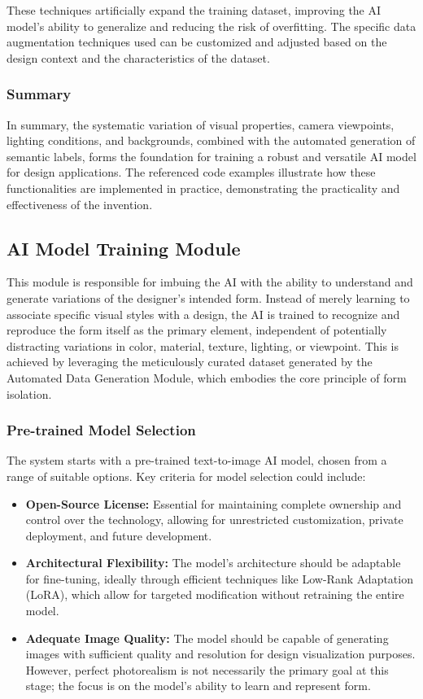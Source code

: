 \documentclass{article}
\begin{document}
These techniques artificially expand the training dataset, improving the AI model's ability to generalize and reducing the risk of overfitting. The specific data augmentation techniques used can be customized and adjusted based on the design context and the characteristics of the dataset.

\subsubsection{Summary}

In summary, the systematic variation of visual properties, camera viewpoints, lighting conditions, and backgrounds, combined with the automated generation of semantic labels, forms the foundation for training a robust and versatile AI model for design applications. The referenced code examples illustrate how these functionalities are implemented in practice, demonstrating the practicality and effectiveness of the invention.

\subsection{AI Model Training Module}

This module is responsible for imbuing the AI with the ability to understand and generate variations of the designer's intended form. Instead of merely learning to associate specific visual styles with a design, the AI is trained to recognize and reproduce the form itself as the primary element, independent of potentially distracting variations in color, material, texture, lighting, or viewpoint. This is achieved by leveraging the meticulously curated dataset generated by the Automated Data Generation Module, which embodies the core principle of form isolation.

\subsubsection{Pre-trained Model Selection}
The system starts with a pre-trained text-to-image AI model, chosen from a range of suitable options. Key criteria for model selection could include:

\begin{itemize}
    \item \textbf{Open-Source License:} Essential for maintaining complete ownership and control over the technology, allowing for unrestricted customization, private deployment, and future development.
    \item \textbf{Architectural Flexibility:} The model's architecture should be adaptable for fine-tuning, ideally through efficient techniques like Low-Rank Adaptation (LoRA), which allow for targeted modification without retraining the entire model.
    \item \textbf{Adequate Image Quality:} The model should be capable of generating images with sufficient quality and resolution for design visualization purposes. However, perfect photorealism is not necessarily the primary goal at this stage; the focus is on the model's ability to learn and represent form.
\end{itemize}
\end{document}
